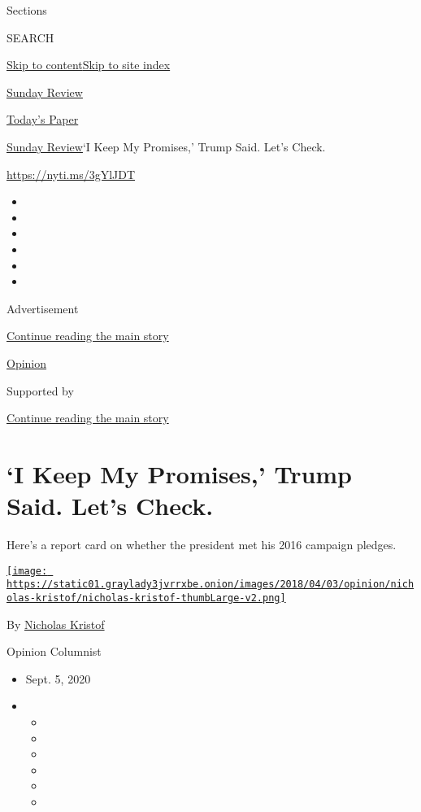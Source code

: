 Sections

SEARCH

\protect\hyperlink{site-content}{Skip to
content}\protect\hyperlink{site-index}{Skip to site index}

\href{https://www.nytimes3xbfgragh.onion/section/opinion/sunday}{Sunday
Review}

\href{https://myaccount.nytimes3xbfgragh.onion/auth/login?response_type=cookie\&client_id=vi}{}

\href{https://www.nytimes3xbfgragh.onion/section/todayspaper}{Today's
Paper}

\href{/section/opinion/sunday}{Sunday Review}\textbar{}`I Keep My
Promises,' Trump Said. Let's Check.

\url{https://nyti.ms/3gYlJDT}

\begin{itemize}
\item
\item
\item
\item
\item
\item
\end{itemize}

Advertisement

\protect\hyperlink{after-top}{Continue reading the main story}

\href{/section/opinion}{Opinion}

Supported by

\protect\hyperlink{after-sponsor}{Continue reading the main story}

\hypertarget{i-keep-my-promises-trump-said-lets-check}{%
\section{`I Keep My Promises,' Trump Said. Let's
Check.}\label{i-keep-my-promises-trump-said-lets-check}}

Here's a report card on whether the president met his 2016 campaign
pledges.

\href{https://www.nytimes3xbfgragh.onion/column/nicholas-kristof}{\texttt{[image: https://static01.graylady3jvrrxbe.onion/images/2018/04/03/opinion/nicholas-kristof/nicholas-kristof-thumbLarge-v2.png]}}

By
\href{https://www.nytimes3xbfgragh.onion/column/nicholas-kristof}{Nicholas
Kristof}

Opinion Columnist

\begin{itemize}
\item
  Sept. 5, 2020
\item
  \begin{itemize}
  \item
  \item
  \item
  \item
  \item
  \item
  \end{itemize}
\end{itemize}

